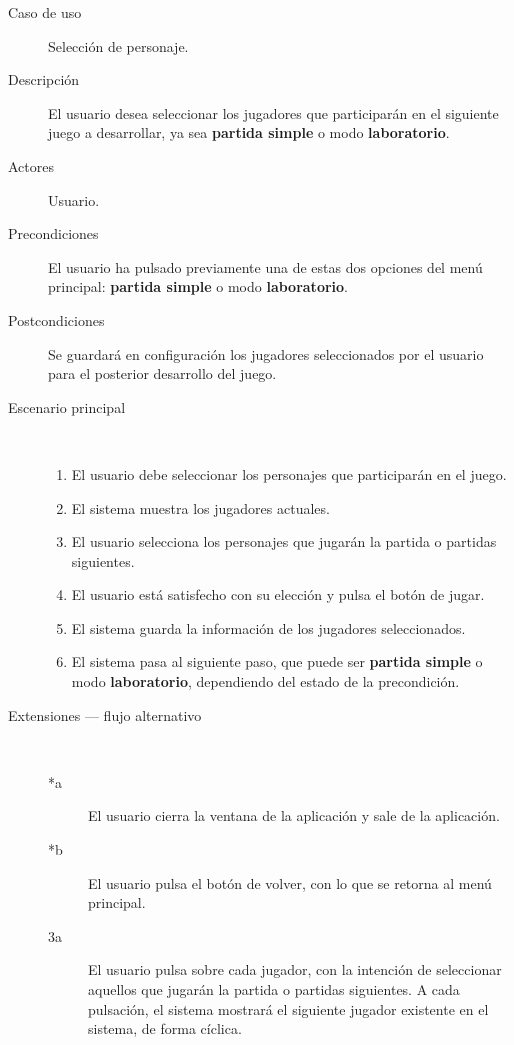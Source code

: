 \begin{description}
    \item[Caso de uso] Selección de personaje.
    \item[Descripción] El usuario desea seleccionar los jugadores que participarán en el siguiente juego
            a desarrollar, ya sea \textbf{partida simple} o modo \textbf{laboratorio}.
    \item[Actores] Usuario.
    \item[Precondiciones] El usuario ha pulsado previamente una de estas dos opciones del menú principal:
            \textbf{partida simple} o modo \textbf{laboratorio}.
    \item[Postcondiciones] Se guardará en configuración los jugadores seleccionados por el usuario para el
            posterior desarrollo del juego.
    \item[Escenario principal] $\quad$
        \begin{enumerate}
            \item El usuario debe seleccionar los personajes que participarán en el juego.
            \item El sistema muestra los jugadores actuales.
            \item El usuario selecciona los personajes que jugarán la partida o partidas siguientes.
            \item El usuario está satisfecho con su elección y pulsa el botón de jugar.
            \item El sistema guarda la información de los jugadores seleccionados.
            \item El sistema pasa al siguiente paso, que puede ser \textbf{partida simple} o modo
                    \textbf{laboratorio}, dependiendo del estado de la precondición.
        \end{enumerate}
    \item[Extensiones --- flujo alternativo] $\quad$
        \begin{description}
            \item[*a ] El usuario cierra la ventana de la aplicación y sale de la aplicación.
            \item[*b ] El usuario pulsa el botón de volver, con lo que se retorna al menú principal.
            \item[3a ] El usuario pulsa sobre cada jugador, con la intención de seleccionar aquellos que
                    jugarán la partida o partidas siguientes. A cada pulsación, el sistema mostrará el
                    siguiente jugador existente en el sistema, de forma cíclica.
        \end{description}
\end{description}

